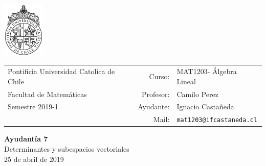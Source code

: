 \documentclass[12pt]{article}
\makeatletter
\newcommand{\ayudantia}{{\sc Ayudantía 7}}
\newcommand{\tituloayu}{Determinantes y subespacios vectoriales}
\newcommand{\fecha}{25 de abril de 2019}
\newcommand{\sigla}{MAT1203}
\newcommand{\nombre}{Álgebra Lineal}
\newcommand{\profesor}{Camilo Perez}
\newcommand{\ano}{2019}
\newcommand{\semestre}{1}
\newcommand{\mail}{mat1203@ifcastaneda.cl}
\makeatother
\begin{document}
\thispagestyle{empty}

\begin{minipage}{2cm}
	\includegraphics[width=2cm]{../../../../img/logo.pdf}
	\vspace{0.5cm}
\end{minipage}
\begin{minipage}{\linewidth}
	\begin{tabular}{lrl}
		{\scriptsize\sc Pontificia Universidad Catolica de Chile} & \hspace*{0.7in}Curso: &
		\sigla  - \nombre\\
		{\sc Facultad de Matemáticas}&
		Profesor: & \profesor \\
		{\sc Semestre \ano-\semestre} & Ayudante: & {Ignacio Castañeda}\\
		& {Mail:} & \texttt{\mail}
	\end{tabular}
\end{minipage}

\vspace{-10mm}
\begin{center}
	{\LARGE\bf \ayudantia}\\
	\vspace{0.1cm}
	{\tituloayu}\\
	\vspace{0.1cm}
	\fecha\\
	\vspace{0.4cm}
\end{center}
\end{document}
